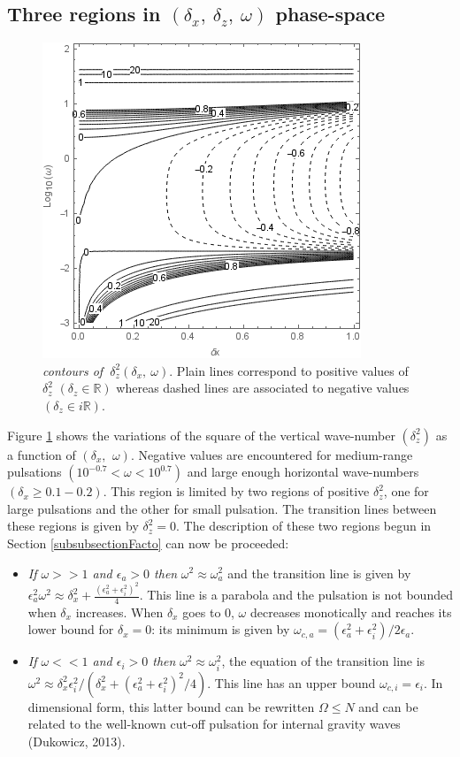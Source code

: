 \documentclass[a4paper,11pt]{article}
\begin{document}
\subsection{Three regions in $(\delta_x,\ \delta_z,\ \omega)$ phase-space}
\label{SubSectionDeltaz}
\begin{figure}[!h]
	\centering	
	\includegraphics[width=0.5\linewidth]{FIGURES/Contour_dz.png}
	\caption{\textit{contours of $\ \delta_z^2(\delta_x,\ \omega)$}. Plain lines correspond to positive values of $\delta_z^2$ $(\delta_z\in\mathbb{R})$ whereas dashed lines are associated to negative values $(\delta_z\in i\mathbb{R})$.}
	\label{FigContourdz}
\end{figure}
Figure \ref{FigContourdz} shows the variations of the square of the vertical wave-number $(\delta_z^2)$ as a function of $(\delta_x,\ \,\omega)$.  Negative values are encountered for medium-range pulsations $(10^{-0.7}<\omega<10^{0.7})$ and large enough horizontal wave-numbers $(\delta_x \geq 0.1-0.2)$. This region is limited by two regions of positive $\delta_z^2$, one for large pulsations and the other for small pulsation. The transition lines between these regions is given by $\delta_z^2=0$. The description of these two regions begun in Section \ref{subsubsectionFacto} can now be proceeded:
\begin{itemize}
	\item \textit{If $\omega>>1$ and $\epsilon_a>0$ then} $\omega^2\approx\omega_a^2$ and the transition line is given by 
	$\epsilon_a^2\omega^2 \approx
	\delta_x^2
 	+\frac{(\epsilon_a^2+\epsilon_i^2)^2}{4}$. This line is a parabola and the pulsation is not bounded when $\delta_x$ increases. 
 	When $\delta_x$ goes to 0, $\omega$ decreases monotically and reaches its lower bound for $\delta_x=0$: its minimum is given by $\omega_{c,a}=(\epsilon_a^2+\epsilon_i^2)/2\epsilon_a$.
	\item \textit{If $\omega<<1$ and $\epsilon_i>0$ then} $\omega^2\approx\omega_i^2$, the equation of the transition line is $\omega^2\approx\delta_x^2\epsilon_i^2/(\delta_x^2+(\epsilon_a^2+\epsilon_i^2)^2/4)$. This line has an upper bound $\omega_{c,i}=\epsilon_i$.
	In dimensional form, this latter bound can be rewritten $\Omega\leq N$ and can be related to the well-known cut-off pulsation for internal gravity waves (Dukowicz, 2013).
\end{itemize}
\end{document}
